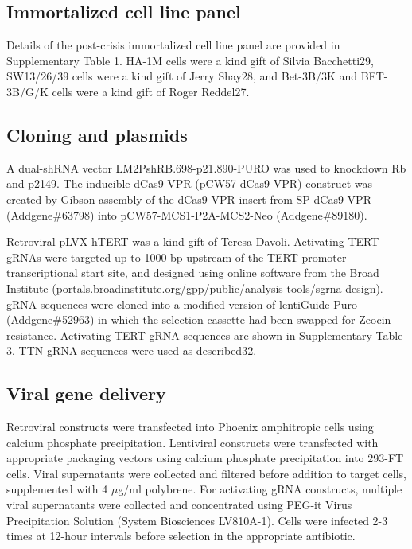 \documentclass[phd,tocprelim]{cornell}
\begin{document}
\subsection*{Immortalized cell line panel }
Details of the post-crisis immortalized cell line panel are provided in Supplementary Table 1. HA-1M cells were a kind gift of Silvia Bacchetti29, SW13/26/39 cells were a kind gift of Jerry Shay28, and Bet-3B/3K and BFT-3B/G/K cells were a kind gift of Roger Reddel27. 

\subsection*{Cloning and plasmids}
A dual-shRNA vector LM2PshRB.698-p21.890-PURO was used to knockdown Rb and p2149. The inducible dCas9-VPR (pCW57-dCas9-VPR) construct was created by Gibson assembly of the dCas9-VPR insert from SP-dCas9-VPR (Addgene\#63798) into pCW57-MCS1-P2A-MCS2-Neo (Addgene\#89180). 

Retroviral pLVX-hTERT was a kind gift of Teresa Davoli. Activating TERT gRNAs were targeted up to 1000 bp upstream of the TERT promoter transcriptional start site, and designed using online software from the Broad Institute (portals.broadinstitute.org/gpp/public/analysis-tools/sgrna-design). gRNA sequences were cloned into a modified version of lentiGuide-Puro (Addgene\#52963) in which the selection cassette had been swapped for Zeocin resistance. Activating TERT gRNA sequences are shown in Supplementary Table 3. TTN gRNA sequences were used as described32.

\subsection*{Viral gene delivery}
Retroviral constructs were transfected into Phoenix amphitropic cells using calcium phosphate precipitation. Lentiviral constructs were transfected with appropriate packaging vectors using calcium phosphate precipitation into 293-FT cells. Viral supernatants were collected and filtered before addition to target cells, supplemented with 4 $\mu$g/ml polybrene. For activating gRNA constructs, multiple viral supernatants were collected and concentrated using PEG-it Virus Precipitation Solution (System Biosciences LV810A-1). Cells were infected 2-3 times at 12-hour intervals before selection in the appropriate antibiotic. 
\end{document}
